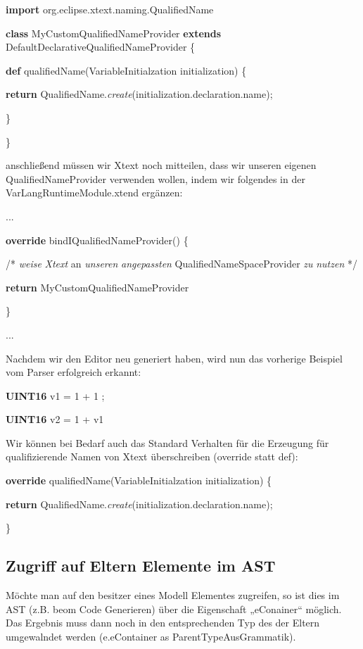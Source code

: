 \documentclass[]{article}
\begin{document}
\textbf{import} org.eclipse.xtext.naming.QualifiedName

\textbf{class} MyCustomQualifiedNameProvider \textbf{extends}
DefaultDeclarativeQualifiedNameProvider \{

\textbf{def} qualifiedName(VariableInitialzation initialization) \{

\textbf{return}
QualifiedName.\emph{create}(initialization.declaration.name);

\}

\}

anschließend müssen wir Xtext noch mitteilen, dass wir unseren eigenen
QualifiedNameProvider verwenden wollen, indem wir folgendes in der
VarLangRuntimeModule.xtend ergänzen:

...

\textbf{override} bindIQualifiedNameProvider() \{

/* \emph{weise} \emph{Xtext} an \emph{unseren} \emph{angepassten}
QualifiedNameSpaceProvider \emph{zu} \emph{nutzen} */

\textbf{return} MyCustomQualifiedNameProvider

\}

...

Nachdem wir den Editor neu generiert haben, wird nun das vorherige
Beispiel vom Parser erfolgreich erkannt:

\textbf{UINT16} v1 = 1 + 1 ;

\textbf{UINT16} v2 = 1 + v1

Wir können bei Bedarf auch das Standard Verhalten für die Erzeugung für
qualifizierende Namen von Xtext überschreiben (override statt def):

\textbf{override} qualifiedName(VariableInitialzation initialization) \{

\textbf{return}
QualifiedName.\emph{create}(initialization.declaration.name);

\}

\subsection[Zugriff auf Eltern Elemente im
AST]{\texorpdfstring{\protect\hypertarget{anchor-55}{}{}Zugriff auf
Eltern Elemente im
AST}{Zugriff auf Eltern Elemente im AST}}\label{zugriff-auf-eltern-elemente-im-ast}

Möchte man auf den besitzer eines Modell Elementes zugreifen, so ist
dies im AST (z.B. beom Code Generieren) über die Eigenschaft
„eConainer`` möglich. Das Ergebnis muss dann noch in den entsprechenden
Typ des der Eltern umgewalndet werden (e.eContainer as
ParentTypeAusGrammatik).
\end{document}
